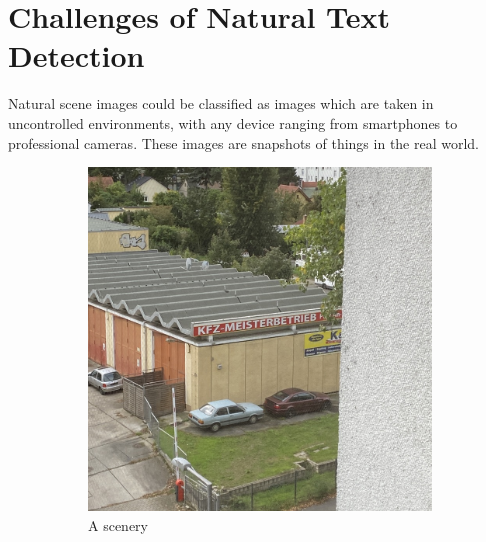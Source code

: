 \documentclass[10pt, a4paper]{article}
\begin{document}
\section{Challenges of Natural Text Detection} %
\label{sec:challenges}
Natural scene images could be classified as images which are taken in uncontrolled environments, with any device ranging from smartphones to professional cameras. These images are snapshots of things in the real world.
\begin{figure}[h!]
	\centering
	\begin{subfigure}[b]{0.4\linewidth}
	  \includegraphics[width=\linewidth]{img/sample2.jpeg}
	  \caption{A scenery}
	\end{subfigure}
	\begin{subfigure}[b]{0.4\linewidth}

\end{subfigure}
\end{figure}
\end{document}
